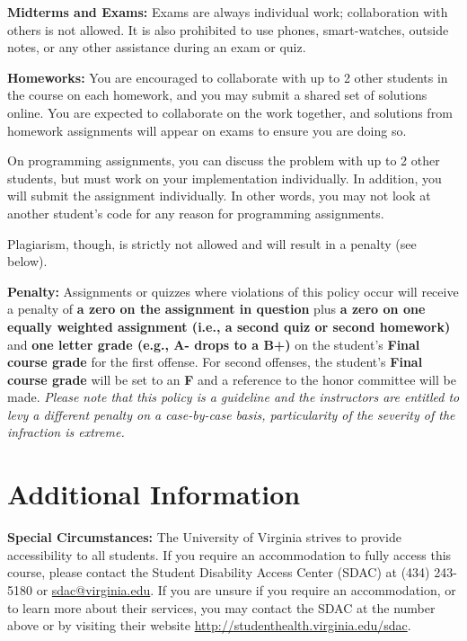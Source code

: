 \documentclass[12pt]{article}
\begin{document}
\textbf{Midterms and Exams:} Exams are always individual work; collaboration with others is not allowed. It is also prohibited to use phones, smart-watches, outside notes, or any other assistance during an exam or quiz.

\textbf{Homeworks:} You are encouraged to collaborate with up to 2 other students in the course on each homework, and you may submit a shared set of solutions online. You are expected to collaborate on the work together, and solutions from homework assignments will appear on exams to ensure you are doing so.

On programming assignments, you can discuss the problem with up to 2 other students, but must work on your implementation individually. In addition, you will submit the assignment individually. In other words, you may not look at another student's code for any reason for programming assignments.

Plagiarism, though, is strictly not allowed and will result in a penalty (see below).

\textbf{Penalty:} Assignments or quizzes where violations of this policy occur will receive a penalty of \textbf{a zero on the assignment in question} plus \textbf{a zero on one equally weighted assignment (i.e., a second quiz or second homework)} and \textbf{one letter grade (e.g., A- drops to a B+)} on the student's \textbf{Final course grade} for the first offense. For second offenses, the student's \textbf{Final course grade} will be set to an \textbf{F} and a reference to the honor committee will be made. \emph{Please note that this policy is a guideline and the instructors are entitled to levy a different penalty on a case-by-case basis, particularity of the severity of the infraction is extreme.}

\section*{Additional Information}


\textbf{Special Circumstances:} The University of Virginia strives to provide accessibility to all students. If you require an accommodation to fully access this course, please contact the Student Disability Access Center (SDAC) at (434) 243-5180 or \url{sdac@virginia.edu}. If you are unsure if you require an accommodation, or to learn more about their services, you may contact the SDAC at the number above or by visiting their website \url{http://studenthealth.virginia.edu/sdac}.
\end{document}
